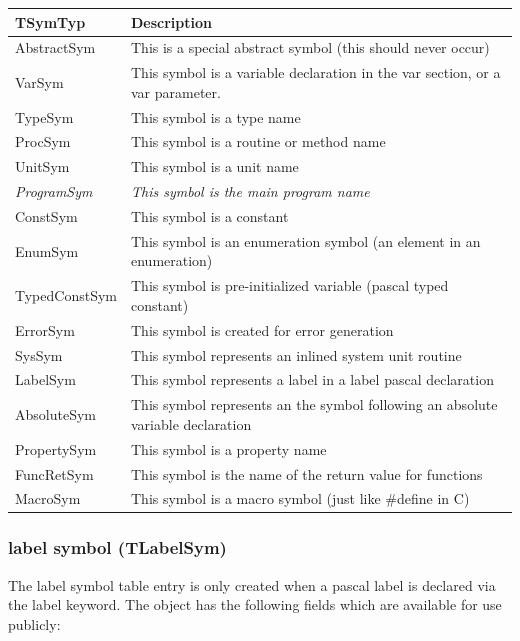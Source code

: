 \documentclass [a4paper,12pt]{article}
\begin{document}
\begin{longtable}{|l|p{10cm}|}
\hline
TSymTyp	& Description \\
\hline
\endhead
\hline
\endfoot
\textsf{AbstractSym}&
	This is a special abstract symbol (this should never occur) \\
\textsf{VarSym}&
	This symbol is a variable declaration in the \textsf{var} section, or a \textsf{var} parameter. \\
\textsf{TypeSym}&
	This symbol is a type name \\
\textsf{ProcSym}&
	This symbol is a routine or method name \\
\textsf{UnitSym}&
	This symbol is a unit name \\
\textsf{\textit{ProgramSym}}&
	\textit{This symbol is the main program name} \\
\textsf{ConstSym}&
	This symbol is a constant \\
\textsf{EnumSym}&
	This symbol is an enumeration symbol (an element in an enumeration) \\
\textsf{TypedConstSym}&
	This symbol is pre-initialized variable (pascal typed constant) \\
\textsf{ErrorSym}&
	This symbol is created for error generation \\
\textsf{SysSym}&
	This symbol represents an inlined system unit routine \\
\textsf{LabelSym}&
	This symbol represents a label in a \textsf{label} pascal declaration \\
\textsf{AbsoluteSym}&
	This symbol represents an the symbol following an \textsf{absolute} variable declaration \\
\textsf{PropertySym}&
	This symbol is a property name \\
\textsf{FuncRetSym}&
	This symbol is the name of the return value for functions \\
\textsf{MacroSym}&
	This symbol is a macro symbol (just like {\#}define in C)
\end{longtable}

\subsubsection{label symbol (TLabelSym)}
\label{subsubsec:label}

The label symbol table entry is only created when a pascal label is declared
via the label keyword. The object has the following fields which are
available for use publicly:
\end{document}
